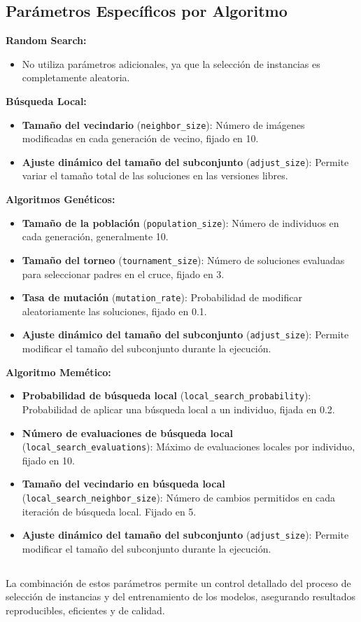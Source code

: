 \subsection{Parámetros Específicos por Algoritmo}

\textbf{Random Search:}
\begin{itemize}
    \item No utiliza parámetros adicionales, ya que la selección de instancias es completamente aleatoria.
\end{itemize}

\textbf{Búsqueda Local:}
\begin{itemize}
    \item \textbf{Tamaño del vecindario} (\texttt{neighbor\_size}): Número de imágenes modificadas en cada generación de vecino, fijado en 10.
    \item \textbf{Ajuste dinámico del tamaño del subconjunto} (\texttt{adjust\_size}): Permite variar el tamaño total de las soluciones en las versiones libres.
\end{itemize}

\textbf{Algoritmos Genéticos:}
\begin{itemize}
    \item \textbf{Tamaño de la población} (\texttt{population\_size}): Número de individuos en cada generación, generalmente 10.
    \item \textbf{Tamaño del torneo} (\texttt{tournament\_size}): Número de soluciones evaluadas para seleccionar padres en el cruce, fijado en 3.
    \item \textbf{Tasa de mutación} (\texttt{mutation\_rate}): Probabilidad de modificar aleatoriamente las soluciones, fijado en 0.1.
    \item \textbf{Ajuste dinámico del tamaño del subconjunto} (\texttt{adjust\_size}): Permite modificar el tamaño del subconjunto durante la ejecución.
\end{itemize}

\textbf{Algoritmo Memético:}
\begin{itemize}
    \item \textbf{Probabilidad de búsqueda local} (\texttt{local\_search\_probability}): Probabilidad de aplicar una búsqueda local a un individuo, fijada en 0.2.
    \item \textbf{Número de evaluaciones de búsqueda local} \\(\texttt{local\_search\_evaluations}): Máximo de evaluaciones locales por individuo, fijado en 10.
    \item \textbf{Tamaño del vecindario en búsqueda local} \\(\texttt{local\_search\_neighbor\_size}): Número de cambios permitidos en cada iteración de búsqueda local.
          Fijado en 5.
    \item \textbf{Ajuste dinámico del tamaño del subconjunto} (\texttt{adjust\_size}): Permite modificar el tamaño del subconjunto durante la ejecución.
\end{itemize}

\subsection*{}
La combinación de estos parámetros permite un control detallado del proceso de selección de instancias y del entrenamiento de los modelos, 
asegurando resultados reproducibles, eficientes y de calidad.
